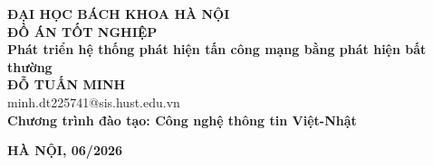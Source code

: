 \documentclass[DoAn.tex]{subfiles}
\begin{document}
\begin{titlepage}
\thispagestyle{empty}
\begin{center}

{\textbf{\large{ĐẠI HỌC BÁCH KHOA HÀ NỘI}}}\\[4cm]

{\textbf{\huge{ ĐỒ ÁN TỐT NGHIỆP}}}\\[1cm]
{\textbf{\Large{Phát triển hệ thống phát hiện tấn công mạng bằng phát hiện bất thường}}}\\[1cm]

{\textbf{\large{ĐỖ TUẤN MINH}}}\\
{\large{minh.dt225741@sis.hust.edu.vn}}\\[0.5cm]

{\textbf{\large{Chương trình đào tạo: Công nghệ thông tin Việt-Nhật}}}%

\vfill


\vfill

{\textbf{HÀ NỘI, 06/2026}}

\end{center}



\end{titlepage}
\end{document}
